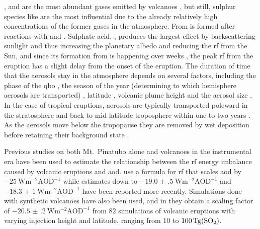 \documentclass{ametsocV6.1}
\begin{document}
,  and  are the most abundant gases emitted by volcanoes
\citep{robock2000}, but still, sulphur species like  are the most influential
due to the already relatively high concentrations of the former gases in the atmosphere.
From   is formed after reactions with  and 
\citep{robock2000}. Sulphate acid, , produces the largest effect by
backscattering sunlight and thus increasing the planetary albedo and reducing the
\gls{rf} from the Sun, and since its formation from  is happening over weeks
\citep{robock2000}, the peak \gls{rf} from the eruption has a slight delay from the
onset of the eruption. The duration of time that the  aerosols stay in the
atmosphere depends on several factors, including the phase of the \gls{qbo}
\citep{pitari2016b}, the season of the year (determining to which hemisphere aerosols
are transported) \citep{toohey2011,toohey2019}, latitude \citep{marshall2019,
  toohey2019}, volcanic plume height \citep{marshall2019} and the aerosol size
\citep{marshall2019}. In the case of tropical eruptions, aerosols are typically
transported poleward in the stratosphere and back to mid-latitude troposphere within one
to two years \citep{robock2000}. As the aerosols move below the tropopause they are
removed by wet deposition before retaining their background state \citep{liu2012}.


Previous studies on both Mt.\ Pinatubo alone \citep{mills2017,hansen2005} and volcanoes
in the instrumental era \citep{gregory2016} have been used to estimate the relationship
between the \gls{rf} energy imbalance caused by volcanic eruptions and \gls{aod}.
\citet{myhre2013} use a formula for \gls{rf} that scales \gls{aod} by
\(\SI{-25}{\watt\metre^{-2}\mathrm{AOD}^{-1}}\) while estimates down to
\(\SI{-19.0(5)}{\watt\metre^{-2}\mathrm{AOD}^{-1}}\) \citep{gregory2016} and
\(\SI{-18.3(10)}{\watt\metre^{-2}\mathrm{AOD}^{-1}}\) \citep{mills2017} have been
reported more recently. Simulations done with synthetic volcanoes have also been used,
and in \citet{marshall2020} they obtain a scaling factor of
\(\SI{-20.5(2)}{\watt\metre^{-2}\mathrm{AOD}^{-1}}\) from \(82\) simulations of volcanic
eruptions with varying injection height and latitude, ranging from \(10\) to
\(\SI{100}{\tera\gram(\ce{SO2})}\).
\end{document}

